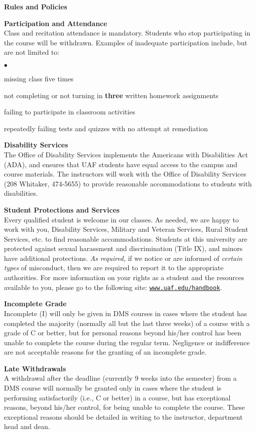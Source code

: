 \documentclass[12pt]{article}
\renewcommand{\emph}[1]{\textsf{\textbf{#1}}}
\newcommand{\localhead}[1]{\par\smallskip\textbf{#1}\nobreak\\}%
\def\heading#1{\localhead{\large\emph{#1}}}
\def\subheading#1{\localhead{\emph{#1}}}
\newenvironment{clist}%
{\bgroup\parskip 0pt\begin{list}{$\bullet$}{\partopsep 4pt\topsep 0pt\itemsep -2pt}}%
{\end{list}\egroup}%
\begin{document}
\heading{Rules and Policies}
\vskip -20pt
\subheading{Participation and Attendance}
Class and recitation attendance is mandatory. Students who stop participating in the course will be withdrawn. Examples of inadequate participation include,
but are not limited to:
\begin{clist}
\item missing class five times
\item not completing or not turning in \textbf{three} written homework assignments
\item failing to participate in classroom activities
\item repeatedly failing tests and quizzes with no attempt at remediation
\end{clist}

\subheading{Disability Services}
The Office of Disability Services implements the
Americans with Disabilities Act (ADA), and ensures that UAF students
have equal access to the campus and course materials. The instructors will work with
the Office of Disability Services (208 Whitaker, 474-5655) to provide
reasonable accommodations to students with disabilities.

\subheading{Student Protections and Services}
Every qualified student is welcome in our classes.  As needed, we are happy to work with you, Disability Services, Military and Veteran Services, Rural Student Services, etc. to find reasonable accommodations. Students at this university are protected against sexual harassment and discrimination (Title IX), and minors have additional protections. \textit{As required,} if we notice or are informed of \textit{certain types} of misconduct, then we are required to report it to the appropriate authorities.  For more information on your rights as a student and the resources available to you, please go to the following site: \href{https://www.uaf.edu/handbook/}{\texttt{www.uaf.edu/handbook}}.

\subheading{Incomplete Grade} 
Incomplete (I) will only be given in DMS courses in cases where the student has completed the majority (normally all but the last three weeks) of a course with a grade of C or better, but for personal reasons beyond his/her control has been unable to complete the course during the regular term. Negligence or indifference are not acceptable reasons for the granting of an incomplete grade. 

\subheading{Late Withdrawals} 
A withdrawal after the deadline (currently 9 weeks into the semester) from a DMS course will normally be granted only in cases where the student is performing satisfactorily (i.e., C or better) in a course, but has exceptional reasons, beyond his/her control, for being unable to complete the course. These exceptional reasons should be detailed in writing to the instructor, department head and dean.
\end{document}
